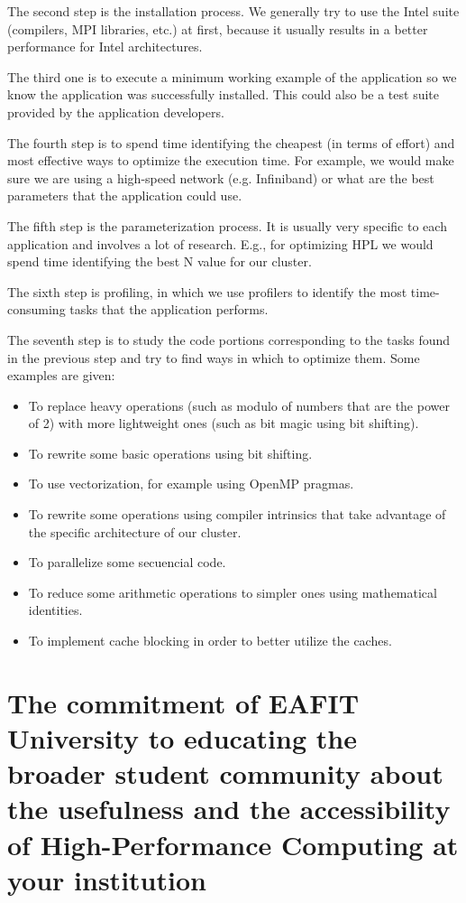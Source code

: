 \documentclass[11pt,a4paper,twocolumn]{article}
\begin{document}
The second step is the installation process. We generally try to use the Intel suite (compilers, MPI libraries, etc.) at first, because it usually results in a better performance for Intel architectures.

The third one is to execute a minimum working example of the application so we know the application was successfully installed. This could also be a test suite provided by the application developers.

The fourth step is to spend time identifying the cheapest (in terms of effort) and most effective ways to optimize the execution time. For example, we would make sure we are using a high-speed network (e.g. Infiniband) or what are the best parameters that the application could use.

The fifth step is the parameterization process. It is usually very specific to each application and involves a lot of research. E.g., for optimizing HPL we would spend time identifying the best N value for our cluster.

The sixth step is profiling, in which we use profilers to identify the most time-consuming tasks that the application performs.

The seventh step is to study the code portions corresponding to the tasks found in the previous step and try to find ways in which to optimize them. Some examples are given:

\begin{itemize}
    \item To replace heavy operations (such as modulo of numbers that are the power of 2) with more lightweight ones (such as bit magic using bit shifting).
    \item To rewrite some basic operations using bit shifting.
    \item To use vectorization, for example using OpenMP pragmas.
    \item To rewrite some operations using compiler intrinsics that take advantage of the specific architecture of our cluster.
    \item To parallelize some secuencial code.
    \item To reduce some arithmetic operations to simpler ones using mathematical identities.
    \item To implement cache blocking in order to better utilize the caches.
\end{itemize}

\section{The commitment of EAFIT University to educating the broader student community about the usefulness and the accessibility of High-Performance Computing at your institution}
\end{document}
